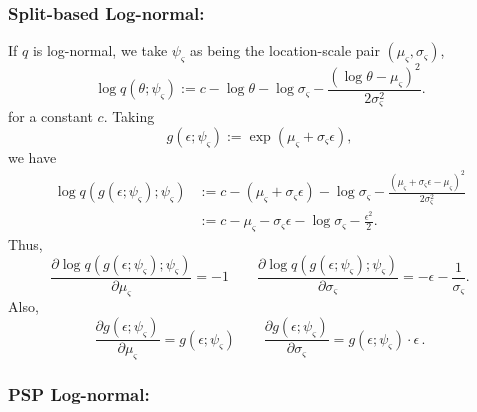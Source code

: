 \documentclass{article}
\begin{document}
\subsubsection*{Split-based Log-normal:}
If $q$ is log-normal, we take $\psi_\varsigma$ as being the location-scale pair $(\mu_\varsigma, \sigma_\varsigma)$,
\[
\log q(\theta; \psi_\varsigma) := c - \log \theta - \log \sigma_\varsigma - \frac{(\log \theta - \mu_\varsigma)^2}{2 \sigma_\varsigma^2}.
\]
for a constant $c$.
Taking
\begin{equation}
g(\epsilon; \psi_\varsigma) := \exp(\mu_\varsigma + \sigma_\varsigma \epsilon),
\label{eq:gLogNorm}
\end{equation}
we have
\begin{align*}
\log q(g(\epsilon; \psi_\varsigma); \psi_\varsigma)
& := c - (\mu_\varsigma + \sigma_\varsigma \epsilon)
    - \log \sigma_\varsigma
    - \frac{(\mu_\varsigma + \sigma_\varsigma \epsilon - \mu_\varsigma)^2}{2 \sigma_\varsigma^2} \\
& := c - \mu_\varsigma - \sigma_\varsigma \epsilon - \log \sigma_\varsigma - \frac{\epsilon^2}{2}.
\end{align*}
Thus,
\begin{equation}
    \frac{\partial \log q(g(\epsilon; \psi_\varsigma); \psi_\varsigma)}{\partial \mu_\varsigma} = -1
    \qquad
    \frac{\partial \log q(g(\epsilon; \psi_\varsigma); \psi_\varsigma)}{\partial \sigma_\varsigma} = -\epsilon - \frac{1}{\sigma_\varsigma}.
    \label{eq:dlogqgdPsi}
\end{equation}
Also,
\begin{equation}
    \frac{\partial g(\epsilon; \psi_\varsigma)}{\partial \mu_\varsigma} = g(\epsilon; \psi_\varsigma)
    \qquad
    \frac{\partial g(\epsilon; \psi_\varsigma)}{\partial \sigma_\varsigma} = g(\epsilon; \psi_\varsigma) \cdot \epsilon \, .
    \label{eq:dgdPsi}
\end{equation}


\subsubsection*{PSP Log-normal:}
\end{document}
